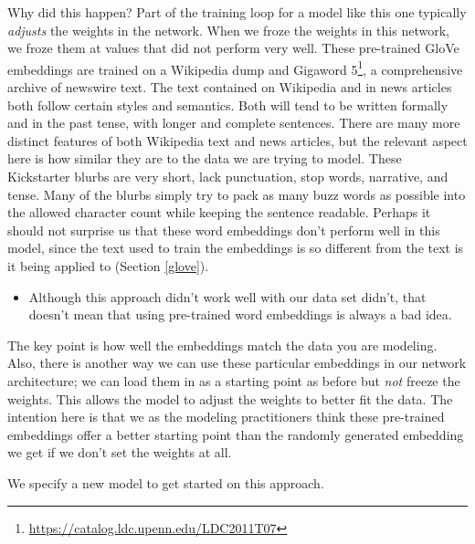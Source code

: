 \documentclass[
]{krantz}
\DeclareRobustCommand{\href}[2]{#2\footnote{\url{#1}}}
\renewcommand{\href}[2]{#2\footnote{\url{#1}}}
\newenvironment{rmdblock}[1]
  {\begin{shaded*}
  \begin{itemize}[left = -1cm, labelsep = 1cm]
  \renewcommand{\labelitemi}{
    \raisebox{-.7\height}[0pt][0pt]{
      {\setkeys{Gin}{width=3em,keepaspectratio}\texttt{[image: images/\#1]}}
    }
  }
 
  \item
  }
  {
  \end{itemize}
  \end{shaded*}
  }
\newenvironment{rmdwarning}
  {\begin{rmdblock}{warning}}
  {\end{rmdblock}}
\begin{document}
Why did this happen? Part of the training loop for a model like this one typically \emph{adjusts} the weights in the network.
When we froze the weights in this network, we froze them at values that did not perform very well.
These pre-trained GloVe embeddings \citep{Pennington2014} are trained on a Wikipedia dump and \href{https://catalog.ldc.upenn.edu/LDC2011T07}{Gigaword 5}, a comprehensive archive of newswire text.
The text contained on Wikipedia and in news articles both follow certain styles and semantics.
Both will tend to be written formally and in the past tense, with longer and complete sentences.
There are many more distinct features of both Wikipedia text and news articles, but the relevant aspect here is how similar they are to the data we are trying to model.
These Kickstarter blurbs are very short, lack punctuation, stop words, narrative, and tense. Many of the blurbs simply try to pack as many buzz words as possible into the allowed character count while keeping the sentence readable.
Perhaps it should not surprise us that these word embeddings don't perform well in this model, since the text used to train the embeddings is so different from the text is it being applied to (Section \ref{glove}).

\begin{rmdwarning}
Although this approach didn't work well with our data set didn't, that
doesn't mean that using pre-trained word embeddings is always a bad
idea.
\end{rmdwarning}

The key point is how well the embeddings match the data you are modeling.
Also, there is another way we can use these particular embeddings in our network architecture; we can load them in as a starting point as before but \emph{not} freeze the weights.
This allows the model to adjust the weights to better fit the data. The intention here is that we as the modeling practitioners think these pre-trained embeddings offer a better starting point than the randomly generated embedding we get if we don't set the weights at all.

We specify a new model to get started on this approach.
\end{document}
